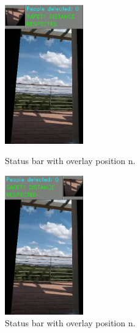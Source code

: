 \documentclass[12pt]{article}
\begin{document}
\begin{figure}[H]
  \centering
  \begin{minipage}[b]{0.45\textwidth}
    \centering
    \includegraphics[height=6cm,keepaspectratio]{img/ovl_0.jpg}
    \caption{Status bar with overlay position n.}
    \label{fig:ovl0}
  \end{minipage}
  \hfill
  \begin{minipage}[b]{0.45\textwidth}
    \centering
    \includegraphics[height=6cm,keepaspectratio]{img/ovl_1.jpg}
    \caption{Status bar with overlay position n.}
    \label{fig:ovl1}
  \end{minipage}
\end{figure}
\end{document}
